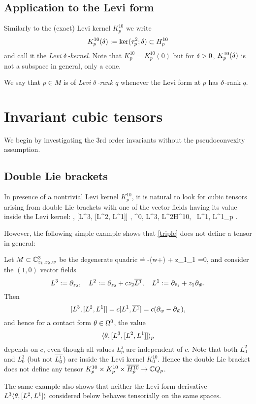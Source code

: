\documentclass[12pt]{amsart}
\begin{document}
\subsection{Application to the Levi form}
Similarly to the (exact) 
Levi kernel $K^{10}_p$
we write
$$
	K^{10}_p(\delta) := \ker(\tau^2_p; \delta)  \subset H^{10}_p
$$
and call it the {\em Levi $\delta$-kernel}.
Note that $K^{10}_p = K^{10}_p(0)$
but for $\delta>0$, $K^{10}_p(\delta)$ is not a subspace in general, only a cone.

\bd
We say that $p\in M$ is of {\em Levi $\delta$-rank $q$}
whenever the Levi form at $p$ has $\delta$-rank $q$.
\ed



\section{Invariant cubic tensors}

We begin by investigating the $3$rd order invariants
without the pseudoconvexity assumption.

\subsection{Double Lie brackets}
In presence of a nontrivial Levi kernel $K^{10}_p$,
it is natural to look for cubic tensors
arising from double Lie brackets
with one of the vector fields 
having its value inside the Levi kernel: 
\beq{}
	\la \th, [L^3, [L^2, L^1]] \ra, 
	\quad
	\th \in \Om^0,
	\quad L^3, L^2\in H^{10}, 
	\, L^1\in {}, 
	\quad
	L^1_p \in {}.	
\eeq

However, the following simple example shows that 
\eqref{triple} does not define a tensor in general:

\be{}
Let $M\subset {\mathbb{C}}^3_{z_1, z_2, w}$ be
the degenerate quadric
\beq{}
	\r = -(w+\w) + z_1\z_1 =0,
\eeq
and consider the $(1,0)$ vector fields
$$
	L^3:= \partial_{z_2},
	\quad
	L^2:= \partial_{z_2} + cz_2 \overline{L^1},
	\quad
	L^1:= \partial_{{\bar z}_1} + z_1\partial_{{\bar w}}.
$$
Then 
$$
	[L^3, [L^2, L^1]] = c [L^1, \overline{L^1}] = c (\partial_{w} - \partial_{{\bar w}}),
$$
and hence for a contact form $\theta\in \Omega^0$,
the value $$\langle \theta, [L^3, [L^2, L^1]] \rangle_p$$
depends on $c$,
even though all values $L^j_p$ are independent of $c$.
Note that both $L^2_0$ and $L^3_0$ (but not $\overline{L^1_0}$)
are inside the Levi kernel $K^{10}_0$.
Hence the double Lie bracket does not define any tensor
$K^{10}_p\times K^{10}_p \times \overline{H^{10}_p}\to {\mathbb{C}} Q_p$.

The same example also shows that neither
the Levi form derivative $L^3 \langle \theta, [L^2, L^1]\rangle$
considered below
behaves tensorially on the same spaces.
\ee
\end{document}
